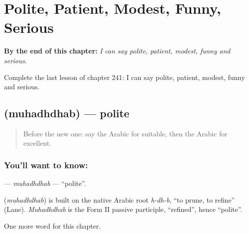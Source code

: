 
\chapter{Polite, Patient, Modest, Funny, Serious}
\label{ch:ar-polite-patient-modest-funny-serious}

\begin{chapteropening}
\textbf{By the end of this chapter:} \emph{I can say polite, patient, modest, funny and serious.}

Complete the last lesson of chapter 241: I can say polite, patient, modest, funny and serious.
\end{chapteropening}

\section[\texorpdfstring{\ar{مهذب} (muhadhdhab)}{مهذب (muhadhdhab)}]{ (muhadhdhab) — polite}

\label{lesson:AR-C241-muhadhdhab}



\begin{quote}
Before the new one: say the Arabic for suitable, then the Arabic for excellent.
\end{quote}

\subsection*{You'll want to know: }
\textbf{} — \emph{muhadhdhab} — \textquotedblleft{}polite\textquotedblright{}.

\begin{cousinweb}
\textbf{} (\emph{muhadhdhab}) is built on the native Arabic root \emph{h-dh-b}, \textquotedblleft{}to prune, to refine\textquotedblright{} (Lane). \emph{Muhadhdhab} is the Form II passive participle, \textquotedblleft{}refined\textquotedblright{}, hence \textquotedblleft{}polite\textquotedblright{}.
\end{cousinweb}

\begin{grammarlens}[title={What you've built}]
One more word for this chapter.
\end{grammarlens}

